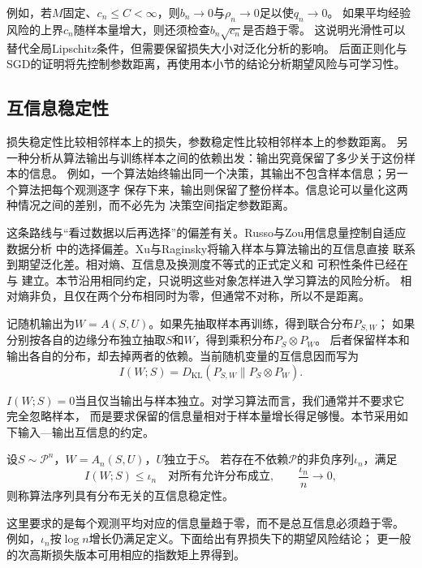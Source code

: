 例如，若$M$固定、$c_n\leq C<\infty$，则$b_n\to0$与$\rho_n\to0$足以使$q_n\to0$。
如果平均经验风险的上界$c_n$随样本量增大，则还须检查$b_n\sqrt{c_n}$是否趋于零。
这说明光滑性可以替代全局Lipschitz条件，但需要保留损失大小对泛化分析的影响。
后面正则化与SGD的证明将先控制参数距离，再使用本小节的结论分析期望风险与可学习性。

\subsection{互信息稳定性}
\label{sec:information-stability}

损失稳定性比较相邻样本上的损失，参数稳定性比较相邻样本上的参数距离。
另一种分析从算法输出与训练样本之间的依赖出发：输出究竟保留了多少关于这份样本的信息。
例如，一个算法始终输出同一个决策，其输出不包含样本信息；另一个算法把每个观测逐字
保存下来，输出则保留了整份样本。信息论可以量化这两种情况之间的差别，而不必先为
决策空间指定参数距离。

这条路线与“看过数据以后再选择”的偏差有关。Russo与Zou用信息量控制自适应数据分析
中的选择偏差。Xu与Raginsky将输入样本与算法输出的互信息直接
联系到期望泛化差。相对熵、互信息及换测度不等式的正式定义和
可积性条件已经在
与
建立。本节沿用相同约定，只说明这些对象怎样进入学习算法的风险分析。
相对熵非负，且仅在两个分布相同时为零，但通常不对称，所以不是距离。

记随机输出为$W=A(S,U)$。如果先抽取样本再训练，得到联合分布$P_{S,W}$；
如果分别按各自的边缘分布独立抽取$S$和$W$，得到乘积分布$P_S\otimes P_W$。
后者保留样本和输出各自的分布，却去掉两者的依赖。当前随机变量的互信息因而写为
\[
 I(W;S)=D_{\mathrm{KL}}(P_{S,W}\|P_S\otimes P_W).
\]

$I(W;S)=0$当且仅当输出与样本独立。对学习算法而言，我们通常并不要求它完全忽略样本，
而是要求保留的信息量相对于样本量增长得足够慢。本节采用如下输入—输出互信息的约定。

\begin{definition}[互信息稳定性]
\label{def:mutual-information-stability}
设$S\sim\mathcal P^n$，$W=A_n(S,U)$，$U$独立于$S$。
若存在不依赖$\mathcal P$的非负序列$\iota_n$，满足
\[
 I(W;S)\leq\iota_n\quad\text{对所有允许分布成立},
 \qquad \frac{\iota_n}{n}\longrightarrow0,
\]
则称算法序列具有分布无关的互信息稳定性。
\end{definition}

这里要求的是每个观测平均对应的信息量趋于零，而不是总互信息必须趋于零。
例如，$\iota_n$按$\log n$增长仍满足定义。下面给出有界损失下的期望风险结论；
更一般的次高斯损失版本可用相应的指数矩上界得到。

